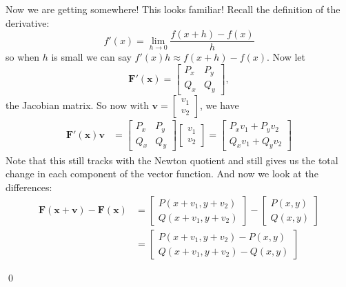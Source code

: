 \documentclass[letterpaper, 11pt, openany]{book}
\theoremstyle{mytheoremstyle}
\renewenvironment{proof}{{\par \sffamily \smaller \fontseries{b}\selectfont Proof}}{\hfill\qed}
\theoremstyle{myexamplestyle}
\begin{document}
\begin{proof}
    Now we are getting somewhere! This looks familiar! Recall the definition of the derivative:
    \[f'(x) = \lim_{h \to 0} \frac{f(x+h) - f(x)}{h}\]
    so when \(h\) is small we can say \(f'(x) h \approx f(x+h) - f(x)\). Now let
    \[\mathbf{F}'(\mathbf{x}) = \begin{bmatrix}
        P_{x} & P_{y} \\
        Q_{x} & Q_{y}
    \end{bmatrix},\]
    the Jacobian matrix. So now with \(\mathbf{v} = \begin{bmatrix}
        v_{1}\\
        v_{2}
    \end{bmatrix}\), we have
    \begin{align*}
        \mathbf{F}'(\mathbf{x})  \mathbf{v} &= \begin{bmatrix}
            P_{x} & P_{y} \\
            Q_{x} & Q_{y}
        \end{bmatrix}
        \begin{bmatrix}
            v_{1}\\
            v_{2}
        \end{bmatrix} = 
        \begin{bmatrix}
            P_{x}v_{1} + P_{y}v_{2}\\
            Q_{x}v_{1} + Q_{y}v_{2}
        \end{bmatrix}
    \end{align*}
    Note that this still tracks with the Newton quotient and still gives us the total change in each component of the vector function. And now we look at the differences:
    \begin{align*}
        \mathbf{F}(\mathbf{x} + \mathbf{v}) - \mathbf{F}(\mathbf{x}) &= 
        \begin{bmatrix}
            P(x + v_{1}, y + v_{2})\\
            Q(x + v_{1}, y + v_{2})
        \end{bmatrix} -
        \begin{bmatrix}
            P(x,y)\\
            Q(x,y)
        \end{bmatrix}\\
        &= \begin{bmatrix}
            P(x + v_{1}, y + v_{2}) - P(x,y)\\
            Q(x + v_{1}, y + v_{2}) - Q(x,y)
        \end{bmatrix}
    \end{align*}

\end{proof}
\end{document}
